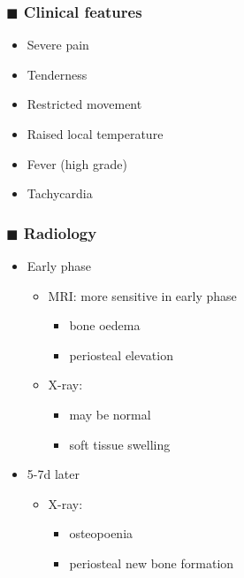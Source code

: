 \documentclass[
  12pt,
]{memoir}
\providecommand{\tightlist}{%
  \setlength{\itemsep}{0pt}\setlength{\parskip}{0pt}}
\begin{document}
\hypertarget{blacksquare-clinical-features}{%
\subsubsection{\texorpdfstring{\(\blacksquare\) Clinical
features}{\textbackslash blacksquare Clinical features}}\label{blacksquare-clinical-features}}

\begin{itemize}
\tightlist
\item
  Severe pain
\item
  Tenderness
\item
  Restricted movement
\item
  Raised local temperature
\item
  Fever (high grade)
\item
  Tachycardia
\end{itemize}

\hypertarget{blacksquare-radiology}{%
\subsubsection{\texorpdfstring{\(\blacksquare\)
Radiology}{\textbackslash blacksquare Radiology}}\label{blacksquare-radiology}}

\begin{itemize}
\tightlist
\item
  Early phase

  \begin{itemize}
  \tightlist
  \item
    MRI: more sensitive in early phase

    \begin{itemize}
    \tightlist
    \item
      bone oedema
    \item
      periosteal elevation
    \end{itemize}
  \item
    X-ray:

    \begin{itemize}
    \tightlist
    \item
      may be normal
    \item
      soft tissue swelling
    \end{itemize}
  \end{itemize}
\item
  5-7d later

  \begin{itemize}
  \tightlist
  \item
    X-ray:

    \begin{itemize}
    \tightlist
    \item
      osteopoenia
    \item
      periosteal new bone formation
    \end{itemize}
  \end{itemize}
\end{itemize}
\end{document}
